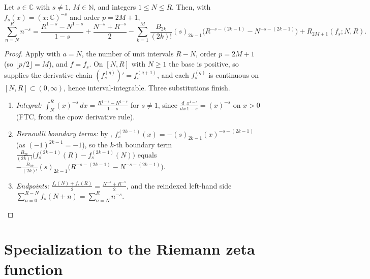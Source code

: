 \begin{lemma}
\label{lem:sum_cpow}
\leanok
{}
Let $s \in \mathbb{C}$ with $s \neq 1$, $M \in \mathbb{N}$, and integers $1 \le N \le R$.
Then, with $f_s(x) = (x:\mathbb{C})^{-s}$ and order $p = 2M+1$,
\[
  \sum_{n=N}^{R} n^{-s}
  = \frac{R^{1-s} - N^{1-s}}{1-s} + \frac{N^{-s}+R^{-s}}{2}
    - \sum_{k=1}^{M}\frac{B_{2k}}{(2k)!}(s)_{2k-1}\bigl(R^{-s-(2k-1)} - N^{-s-(2k-1)}\bigr)
    + R_{2M+1}(f_s; N, R).
\]
\end{lemma}

\begin{proof}
\leanok
{}
Apply  with $a = N$, the number of unit intervals $R - N$, order
$p = 2M+1$ (so $\lfloor p/2\rfloor = M$), and $f = f_s$. On $[N,R]$ with $N \ge 1$ the base
is positive, so  supplies the derivative chain
$(f_s^{(q)})' = f_s^{(q+1)}$, and each $f_s^{(q)}$ is continuous on $[N,R] \subset (0,\infty)$,
hence interval-integrable. Three substitutions finish.
\begin{enumerate}
\item \emph{Integral:} $\int_N^R (x)^{-s}\,dx = \frac{R^{1-s}-N^{1-s}}{1-s}$ for $s \neq 1$,
  since $\frac{d}{dx}\frac{x^{1-s}}{1-s} = (x)^{-s}$ on $x > 0$ (FTC, from the cpow
  derivative rule).
\item \emph{Bernoulli boundary terms:} by ,
  $f_s^{(2k-1)}(x) = -(s)_{2k-1}(x)^{-s-(2k-1)}$ (as $(-1)^{2k-1} = -1$), so the $k$-th
  boundary term $\frac{B_{2k}}{(2k)!}\bigl(f_s^{(2k-1)}(R)-f_s^{(2k-1)}(N)\bigr)$ equals
  $-\frac{B_{2k}}{(2k)!}(s)_{2k-1}\bigl(R^{-s-(2k-1)}-N^{-s-(2k-1)}\bigr)$.
\item \emph{Endpoints:} $\frac{f_s(N)+f_s(R)}{2} = \frac{N^{-s}+R^{-s}}{2}$, and the
  reindexed left-hand side $\sum_{n=0}^{R-N} f_s(N+n) = \sum_{n=N}^{R} n^{-s}$.
\end{enumerate}
\end{proof}

\section{Specialization to the Riemann zeta function}
\label{sec:em_zeta}

